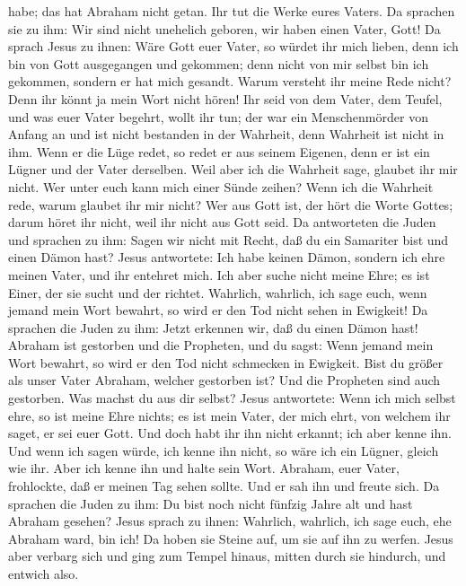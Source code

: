 habe; das hat Abraham nicht getan.  Ihr tut die Werke
eures Vaters. Da sprachen sie zu ihm: Wir sind nicht unehelich geboren,
wir haben einen Vater, Gott!  Da sprach Jesus zu ihnen:
Wäre Gott euer Vater, so würdet ihr mich lieben, denn ich bin von Gott
ausgegangen und gekommen; denn nicht von mir selbst bin ich gekommen,
sondern er hat mich gesandt.  Warum versteht ihr meine
Rede nicht? Denn ihr könnt ja mein Wort nicht hören!  Ihr
seid von dem Vater, dem Teufel, und was euer Vater begehrt, wollt ihr
tun; der war ein Menschenmörder von Anfang an und ist nicht bestanden in
der Wahrheit, denn Wahrheit ist nicht in ihm. Wenn er die Lüge redet, so
redet er aus seinem Eigenen, denn er ist ein Lügner und der Vater
derselben.  Weil aber ich die Wahrheit sage, glaubet ihr
mir nicht.  Wer unter euch kann mich einer Sünde zeihen?
Wenn ich die Wahrheit rede, warum glaubet ihr mir nicht? 
Wer aus Gott ist, der hört die Worte Gottes; darum höret ihr nicht, weil
ihr nicht aus Gott seid.  Da antworteten die Juden und
sprachen zu ihm: Sagen wir nicht mit Recht, daß du ein Samariter bist
und einen Dämon hast?  Jesus antwortete: Ich habe keinen
Dämon, sondern ich ehre meinen Vater, und ihr entehret mich.
 Ich aber suche nicht meine Ehre; es ist Einer, der sie
sucht und der richtet.  Wahrlich, wahrlich, ich sage
euch, wenn jemand mein Wort bewahrt, so wird er den Tod nicht sehen in
Ewigkeit!  Da sprachen die Juden zu ihm: Jetzt erkennen
wir, daß du einen Dämon hast! Abraham ist gestorben und die Propheten,
und du sagst: Wenn jemand mein Wort bewahrt, so wird er den Tod nicht
schmecken in Ewigkeit.  Bist du größer als unser Vater
Abraham, welcher gestorben ist? Und die Propheten sind auch gestorben.
Was machst du aus dir selbst?  Jesus antwortete: Wenn ich
mich selbst ehre, so ist meine Ehre nichts; es ist mein Vater, der mich
ehrt, von welchem ihr saget, er sei euer Gott.  Und doch
habt ihr ihn nicht erkannt; ich aber kenne ihn. Und wenn ich sagen
würde, ich kenne ihn nicht, so wäre ich ein Lügner, gleich wie ihr. Aber
ich kenne ihn und halte sein Wort.  Abraham, euer Vater,
frohlockte, daß er meinen Tag sehen sollte. Und er sah ihn und freute
sich.  Da sprachen die Juden zu ihm: Du bist noch nicht
fünfzig Jahre alt und hast Abraham gesehen?  Jesus sprach
zu ihnen: Wahrlich, wahrlich, ich sage euch, ehe Abraham ward, bin ich!
 Da hoben sie Steine auf, um sie auf ihn zu werfen. Jesus
aber verbarg sich und ging zum Tempel hinaus, mitten durch sie hindurch,
und entwich also.

